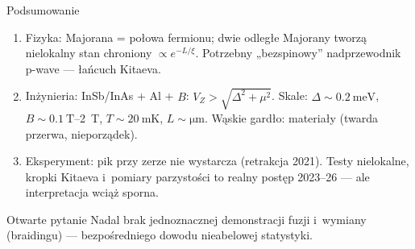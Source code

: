 \documentclass[aspectratio=169,10pt]{beamer}
\begin{document}
\begin{frame}{Podsumowanie}
  \begin{enumerate}
    \item \alert{Fizyka}: Majorana = połowa fermionu; dwie odległe Majorany tworzą
          nielokalny stan chroniony $\propto e^{-L/\xi}$. Potrzebny „bezspinowy”
          nadprzewodnik p-wave — łańcuch Kitaeva.
    \item \alert{Inżynieria}: InSb/InAs + Al + $B$: $V_Z>\sqrt{\Delta^2+\mu^2}$.
          Skale: $\Delta\sim\qty{0.2}{\milli\electronvolt}$, $B\sim\qty{0.1}{\tesla}$–\qty{2}{\tesla},
          $T\sim\qty{20}{\milli\kelvin}$, $L\sim\unit{\micro\metre}$. Wąskie gardło:
          materiały (twarda przerwa, nieporządek).
    \item \alert{Eksperyment}: pik przy zerze nie wystarcza (retrakcja 2021). Testy nielokalne,
          kropki Kitaeva i~pomiary parzystości to realny postęp 2023–26 — ale
          interpretacja wciąż sporna.
  \end{enumerate}
  \vspace{3mm}
  \begin{alertblock}{Otwarte pytanie}
    Nadal brak jednoznacznej demonstracji \alert{fuzji i~wymiany (braidingu)} —
    bezpośredniego dowodu nieabelowej statystyki.
  \end{alertblock}
\end{frame}
\end{document}
